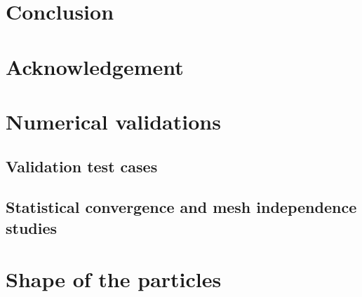 \documentclass[12pt]{My_preprint}
\begin{document}
\section{Conclusion}


\section*{Acknowledgement}

\appendix
\section{Numerical validations}
\label{ap:A}
\subsection{Validation test cases}

\subsection{Statistical convergence and mesh independence studies}


\section{Shape of the particles}
\label{app:shape}



\end{document}
